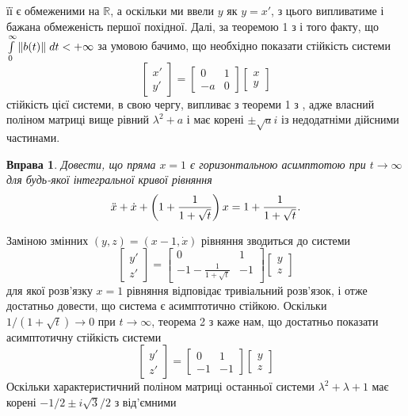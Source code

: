 \documentclass[12pt]{article} %
\newtheorem{prob}{Вправа}
\begin{document}
її є обмеженими на $\mathbb{R}$, а оскільки ми ввели $y$ як $y=x'$, з цього випливатиме і бажана обмеженість першої похідної. Далі, за теоремою
1 з \cite[\S12]{demidovich} і того факту, що $\int_{0}^\infty\mynorm{b(t)}\;dt<+\infty$ за умовою бачимо, що
необхідно показати стійкість системи
\[\begin{bmatrix}x'\\y'\end{bmatrix}=\begin{bmatrix}0&1\\-a&0\end{bmatrix}\begin{bmatrix}x\\y\end{bmatrix}\]
стійкість цієї системи, в свою чергу, випливає з теореми 1 з \cite[\S8]{demidovich}, адже власний поліном матриці вище рівний $\lambda^2+a$
і має корені $\pm \sqrt{a}i$ із недодатніми дійсними частинами.
\begin{prob}Довести, що пряма $x=1$ є горизонтальною асимптотою при $t\to\infty$ для будь-якої інтегральної кривої рівняння
	\[\ddot{x}+\dot{x}+\left(1+\frac{1}{1+\sqrt{t}}\right)x=1+\frac{1}{1+\sqrt{t}}.\]\end{prob}
Заміною змінних $(y,z)=(x-1,\dot{x})$ рівняння зводиться до системи
\[\begin{bmatrix}y'\\z'\end{bmatrix}=\begin{bmatrix}0&1\\-1-\frac{1}{1+\sqrt{t}}&-1\end{bmatrix}\begin{bmatrix}y\\z\end{bmatrix}\]
для якої розв’язку $x=1$ рівняння відповідає тривіальний розв’язок, і отже достатньо довести, що система є асимптотично стійкою. Оскільки
$1/(1+\sqrt{t})\to0$ при $t\to\infty$, теорема 2 з \cite[\S12]{demidovich} каже нам, що достатньо показати асимптотичну стійкість системи
\[\begin{bmatrix}y'\\z'\end{bmatrix}=\begin{bmatrix}0&1\\-1&-1\end{bmatrix}\begin{bmatrix}y\\z\end{bmatrix}\]
Оскільки характеристичний поліном матриці останньої системи $\lambda^2+\lambda+1$ має корені $-1/2\pm i\sqrt{3}/2$ з від’ємними
\end{document}
